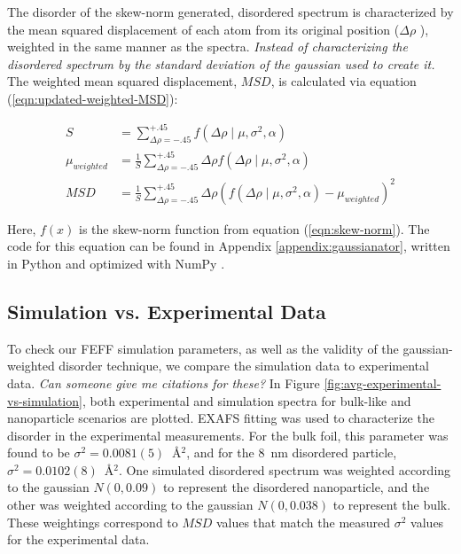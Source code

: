 The disorder of the skew-norm generated, disordered spectrum is characterized by the mean squared displacement of each atom from its original position ($ \Delta\rho $ ), weighted in the same manner as the spectra. \textit{Instead of characterizing the disordered spectrum by the standard deviation of the gaussian used to create it.} The weighted mean squared displacement, $ MSD $, is calculated via equation (\ref{eqn:updated-weighted-MSD}):


\begin{align}
	\label{eqn:updated-weighted-MSD}
	S &= \sum_{\Delta\rho=-.45}^{+.45} f\left(\Delta \rho \mid \mu, \sigma^2, \alpha \right) \\
	\mu_{weighted} &= \frac{1}{S} \sum_{\Delta\rho=-.45}^{+.45} \Delta\rho f\left(\Delta \rho \mid \mu, \sigma^2, \alpha \right) \\
	MSD &= \frac{1}{S} \sum_{\Delta\rho=-.45}^{+.45} \Delta \rho \left( f ( \Delta \rho \mid \mu, \sigma^2, \alpha ) - \mu_{weighted} \right) ^2
\end{align}

\noindent
Here, $ f(x) $ is the skew-norm function from equation (\ref{eqn:skew-norm}). The code for this equation can be found in Appendix \ref{appendix:gaussianator}, written in Python and optimized with NumPy \cite{numpy}.

\subsection{Simulation vs. Experimental Data} \label{sec:end-disorder}

To check our FEFF simulation parameters, as well as the validity of the gaussian-weighted disorder technique, we compare the simulation data to experimental data. \textit{Can someone give me citations for these?} In Figure \ref{fig:avg-experimental-vs-simulation}, both experimental and simulation spectra for bulk-like and nanoparticle scenarios are plotted. EXAFS fitting was used to characterize the disorder in the experimental measurements. For the bulk foil, this parameter was found to be $ \sigma^2=0.0081(5)~$ {\AA}$ ^2 $, and for the 8~nm disordered particle, $ \sigma^2=0.0102(8) $~{\AA}$ ^2 $.  One simulated disordered spectrum was weighted according to the gaussian $ N(0, 0.09) $ to represent the disordered nanoparticle, and the other was weighted according to the gaussian $ N(0, 0.038)  $ to represent the bulk. These weightings correspond to $ MSD $ values that match the measured $ \sigma^2 $ values for the experimental data.  

